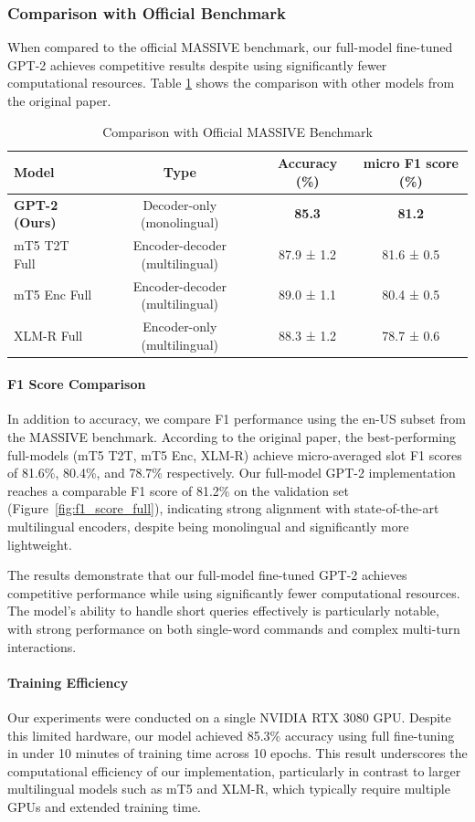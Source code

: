 \documentclass{article}
\begin{document}
\subsubsection{Comparison with Official Benchmark}
When compared to the official MASSIVE benchmark, our full-model fine-tuned GPT-2 achieves competitive results despite using significantly fewer computational resources. Table \ref{tab:benchmark_comparison} shows the comparison with other models from the original paper.

\begin{table}[h]
\centering
\begin{tabular}{lccc}
\toprule
\textbf{Model} & \textbf{Type} & \textbf{Accuracy (\%)} & \textbf{micro F1 score (\%)} \\
\midrule
\textbf{GPT-2 (Ours)} & Decoder-only (monolingual) & \textbf{85.3} & \textbf{81.2} \\
mT5 T2T Full & Encoder-decoder (multilingual) & 87.9 ± 1.2 & 81.6 ± 0.5 \\
mT5 Enc Full & Encoder-decoder (multilingual) & 89.0 ± 1.1 & 80.4 ± 0.5 \\
XLM-R Full & Encoder-only (multilingual) & 88.3 ± 1.2 & 78.7 ± 0.6 \\
\bottomrule
\end{tabular}
\caption{Comparison with Official MASSIVE Benchmark}
\label{tab:benchmark_comparison}
\end{table}

\paragraph{F1 Score Comparison}
In addition to accuracy, we compare F1 performance using the en-US subset from the MASSIVE benchmark. According to the original paper, the best-performing full-models (mT5 T2T, mT5 Enc, XLM-R) achieve micro-averaged slot F1 scores of 81.6\%, 80.4\%, and 78.7\% respectively. Our full-model GPT-2 implementation reaches a comparable F1 score of 81.2\% on the validation set (Figure~\ref{fig:f1_score_full}), indicating strong alignment with state-of-the-art multilingual encoders, despite being monolingual and significantly more lightweight.

The results demonstrate that our full-model fine-tuned GPT-2 achieves competitive performance while using significantly fewer computational resources. The model's ability to handle short queries effectively is particularly notable, with strong performance on both single-word commands and complex multi-turn interactions.

\paragraph{Training Efficiency} Our experiments were conducted on a single NVIDIA RTX 3080 GPU. Despite this limited hardware, our model achieved 85.3\% accuracy using full fine-tuning in under 10 minutes of training time across 10 epochs. This result underscores the computational efficiency of our implementation, particularly in contrast to larger multilingual models such as mT5 and XLM-R, which typically require multiple GPUs and extended training time.
\end{document}
